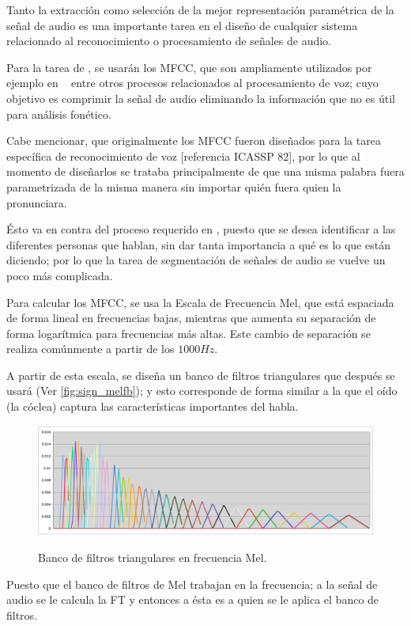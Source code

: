 Tanto la extracción como selección de la mejor representación paramétrica de la señal de audio es una importante tarea en el diseño de cualquier sistema relacionado al reconocimiento o procesamiento de señales de audio. 

Para la tarea de \sd, se usarán los \ac{MFCC}, que son ampliamente utilizados por ejemplo en \sd~ entre otros procesos relacionados al procesamiento de voz; cuyo objetivo es comprimir la señal de audio eliminando la información que no es útil para análisis fonético.

Cabe mencionar, que originalmente los \ac{MFCC} fueron diseñados para la tarea específica de reconocimiento de voz [referencia ICASSP 82], por lo que al momento de diseñarlos se trataba principalmente de que una misma palabra fuera parametrizada de la misma manera sin importar quién fuera quien la pronunciara. 

Ésto va en contra del proceso requerido en \sd, puesto que se desea identificar a las diferentes personas que hablan, sin dar tanta importancia a qué es lo que están diciendo; por lo que la tarea de segmentación de señales de audio se vuelve un poco más complicada.

Para calcular los \ac{MFCC}, se usa la Escala de Frecuencia Mel, que está espaciada de forma lineal en frecuencias bajas, mientras que aumenta su separación de forma logarítmica para frecuencias más altas. Este cambio de separación se realiza comúnmente a partir de los $1000Hz$. 

A partir de esta escala, se diseña un banco de filtros triangulares que después se usará (Ver \autoref{fig:sign_melfb}); y esto corresponde de forma similar a la que el oído (la cóclea) captura las características importantes del habla. 

\begin{figure}[t]
  \myfloatalign
  {\includegraphics[width=0.9\linewidth]{gfx/chap2/melfb}} \quad
  \caption{Banco de filtros triangulares en frecuencia Mel.}
  \label{fig:sign_melfb}
\end{figure}

Puesto que el banco de filtros de Mel trabajan en la frecuencia; a la señal de audio se le calcula la \ac{FT} y entonces a ésta es a quien se le aplica el banco de filtros.

